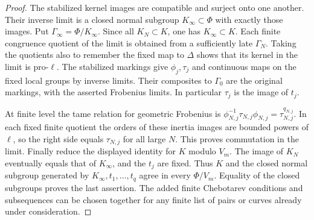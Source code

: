 \documentclass[a4paper,11pt]{article}
\theoremstyle{definition}
\theoremstyle{remark}
\numberwithin{equation}{section}
\begin{document}
\begin{proof}
The stabilized kernel images are compatible and surject onto
one another. Their inverse limit is a closed normal subgroup
\(K_\infty\subset\Phi\) with exactly those images. Put
\(\Gamma_\infty=\Phi/K_\infty\). Since all \(K_N\subset K\),
one has \(K_\infty\subset K\). Each finite congruence
quotient of the limit is obtained from a sufficiently late
\(\Gamma_N\). Taking the quotients also to remember the fixed
map to \(\Delta\) shows that its kernel in the limit is
pro-\(\ell\). The stabilized markings give \(\phi_j,\tau_j\)
and continuous maps on the fixed local groups by inverse
limits. Their composites to \(\Gamma_0\) are the original
markings, with the asserted Frobenius limits. In particular
\(\tau_j\) is the image of \(t_j\).

At finite level the tame relation for geometric Frobenius
is \(\phi_{N,j}^{-1}\tau_{N,j}\phi_{N,j}
=\tau_{N,j}^{q_{N,j}}\). In each fixed finite quotient the
orders of these inertia images are bounded powers of
\(\ell\), so the right side equals \(\tau_{N,j}\) for all
large \(N\). This proves commutation in the limit. Finally
reduce the displayed identity for \(K\) modulo \(V_m\).
The image of \(K_N\) eventually equals that of \(K_\infty\),
and the \(t_j\) are fixed. Thus \(K\) and the closed normal
subgroup generated by \(K_\infty,t_1,\ldots,t_q\) agree
in every \(\Phi/V_m\). Equality of the closed subgroups
proves the last assertion. The added finite Chebotarev
conditions and subsequences can be chosen together for
any finite list of pairs or curves already under consideration.
\end{proof}
\end{document}
